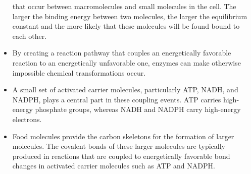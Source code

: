 \begin{itemize}
that occur between macromolecules and small molecules in
the cell. The larger the binding energy between two molecules, the
larger the equilibrium constant and the more likely that these molecules
will be found bound to each other.
\item By creating a reaction pathway that couples an energetically favorable
reaction to an energetically unfavorable one, enzymes can make
otherwise impossible chemical transformations occur.
\item A small set of activated carrier molecules, particularly ATP, NADH,
and NADPH, plays a central part in these coupling events. ATP carries
high-energy phosphate groups, whereas NADH and NADPH carry
high-energy electrons.
\item Food molecules provide the carbon skeletons for the formation of
larger molecules. The covalent bonds of these larger molecules are
typically produced in reactions that are coupled to energetically favorable
bond changes in activated carrier molecules such as ATP and NADPH.
\end{itemize}
